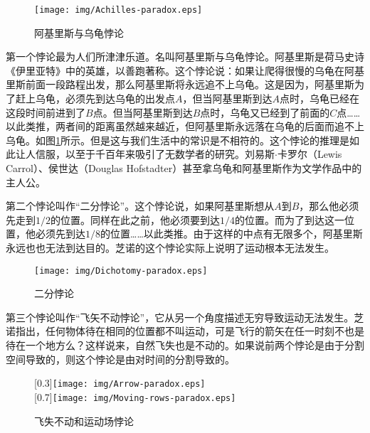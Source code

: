 \documentclass{article}
\begin{document}
\begin{figure}[htbp]
 \centering
 \texttt{[image: img/Achilles-paradox.eps]}
 \caption{阿基里斯与乌龟悖论}
 \label{fig:Achilles-paradox}
\end{figure}

第一个悖论最为人们所津津乐道。名叫阿基里斯与乌龟悖论。阿基里斯是荷马史诗《伊里亚特》中的英雄，以善跑著称。这个悖论说：如果让爬得很慢的乌龟在阿基里斯前面一段路程出发，那么阿基里斯将永远追不上乌龟。这是因为，阿基里斯为了赶上乌龟，必须先到达乌龟的出发点$A$，但当阿基里斯到达$A$点时，乌龟已经在这段时间前进到了$B$点。但当阿基里斯到达$B$点时，乌龟又已经到了前面的$C$点……以此类推，两者间的距离虽然越来越近，但阿基里斯永远落在乌龟的后面而追不上乌龟。如图\ref{fig:Achilles-paradox}所示。但是这与我们生活中的常识是不相符的。这个悖论的推理是如此让人信服，以至于千百年来吸引了无数学者的研究。刘易斯$\cdot$卡罗尔（Lewis Carrol）、侯世达（Douglas Hofstadter）甚至拿乌龟和阿基里斯作为文学作品中的主人公。

第二个悖论叫作“二分悖论”。这个悖论说，如果阿基里斯想从$A$到$B$，那么他必须先走到$1/2$的位置。同样在此之前，他必须要到达$1/4$的位置。而为了到达这一位置，他必须先到达$1/8$的位置……以此类推。由于这样的中点有无限多个，阿基里斯永远也也无法到达目的。芝诺的这个悖论实际上说明了运动根本无法发生。

\begin{figure}[htbp]
 \centering
 \texttt{[image: img/Dichotomy-paradox.eps]}
 \caption{二分悖论}
 \label{fig:Dichotomy-paradox}
\end{figure}

第三个悖论叫作“飞矢不动悖论”，它从另一个角度描述无穷导致运动无法发生。芝诺指出，任何物体待在相同的位置都不叫运动，可是飞行的箭矢在任一时刻不也是待在一个地方么？这样说来，自然飞失也是不动的。如果说前两个悖论是由于分割空间导致的，则这个悖论是由对时间的分割导致的。

\begin{figure}[htbp]
 \centering
 [0.3\linewidth]{\texttt{[image: img/Arrow-paradox.eps]}} \\
 [0.7\linewidth]{\texttt{[image: img/Moving-rows-paradox.eps]}}
 \caption{飞失不动和运动场悖论}
 \label{fig:Arrow-and-Moving-rows-paradox}
\end{figure}
\end{document}
